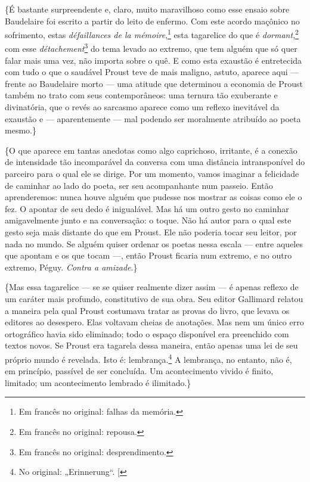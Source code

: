 \{É bastante surpreendente e, claro, muito maravilhoso como esse ensaio
sobre Baudelaire foi escrito a partir do leito de enfermo. Com este
acordo maçônico no sofrimento, estas \emph{défaillances de la mémoire},\footnote{Em francês no original: falhas da memória. \versal{[N. T.]}} esta
tagarelice do que é \emph{dormant},\footnote{Em francês no
  original: repousa. \versal{[N. T.]}} com esse \emph{détachement}\footnote{Em francês no original: desprendimento. \versal{[N. T.]}} do tema levado ao
extremo, que tem alguém que só quer falar mais uma vez, não importa
sobre o quê. E como esta exaustão é entretecida com tudo o que o
saudável Proust teve de mais maligno, astuto, aparece aqui --- frente ao
Baudelaire morto --- uma atitude que determinou a economia de Proust
também no trato com seus contemporâneos: uma ternura tão exuberante e
divinatória, que o revés ao sarcasmo aparece como um reflexo inevitável
da exaustão e --- aparentemente --- mal podendo ser moralmente atribuído ao poeta mesmo.\}

\{O que aparece em tantas anedotas como algo caprichoso, irritante, é a
conexão de intensidade tão incomparável da conversa com uma distância
intransponível do parceiro para o qual ele se dirige. Por um
momento, vamos imaginar a felicidade de caminhar ao lado do poeta, ser seu acompanhante num
passeio. Então aprenderemos: nunca houve alguém que pudesse nos
mostrar as coisas como ele o fez. O apontar de seu dedo é inigualável. Mas
há um outro gesto no caminhar amigavelmente junto e na conversação: o
toque. Não há autor para o qual este gesto seja mais distante do que em
Proust. Ele não poderia tocar seu leitor, por nada no mundo. Se alguém
quiser ordenar os poetas nessa escala --- entre aqueles que apontam e os
que tocam ---, então Proust ficaria num extremo, e no outro extremo,
Péguy. \emph{Contra a amizade}.\}

\{Mas essa tagarelice --- se se quiser realmente dizer assim --- é apenas
reflexo de um caráter mais profundo, constitutivo de sua obra. Seu
editor Gallimard relatou a maneira pela qual Proust costumava tratar
as provas do livro, que levava os editores ao desespero. Elas voltavam
cheias de anotações. Mas nem um único erro ortográfico havia sido
eliminado; todo o espaço disponível era preenchido com textos novos. Se
Proust era tagarela dessa maneira, então apenas uma lei de seu próprio
mundo é revelada. Isto é: lembrança.\footnote{No original: „Erinnerung“. {[}\versal{N. T.}{]}} A lembrança, no entanto, não é, em
princípio, passível de ser concluída. Um acontecimento vivido é finito,
limitado; um acontecimento lembrado é ilimitado.\}

